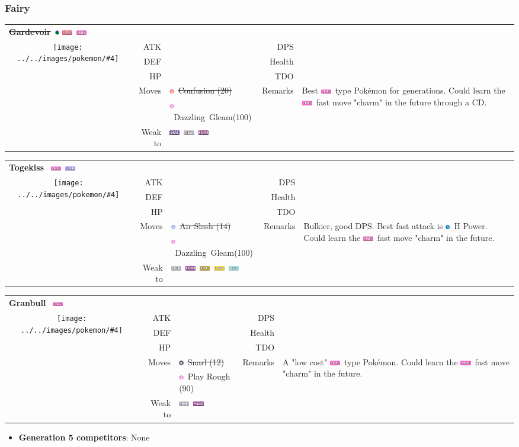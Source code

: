 \documentclass[12pt]{beamer}
\newcommand*{\colorbar}[2]{
\begin{tikzpicture}[line cap=round,line join=round,>=triangle 45,x=1.0cm,y=1.0cm]\clip(-0.15,-0.1) rectangle (2.5,0.1);
\draw [line width=8.pt,color=#1] (0.,0.)-- (#2/130,0.);
\draw[color=white] (0.2,0.) node {\scriptsize{$#2$}};
\end{tikzpicture}
}
\newcommand*{\attack}[1]{\colorbar{red}{#1}}
\newcommand*{\defense}[1]{\colorbar{lightblue}{#1}}
\newcommand*{\stamina}[1]{\colorbar{lightgreen}{#1}}
\newcommand*{\dps}[1]{
\begin{tikzpicture}[line cap=round,line join=round,>=triangle 45,x=1.0cm,y=1.0cm]\clip(-0.15,-0.1) rectangle (2.5,0.1);
\draw [line width=8.pt,color=black] (0.,0.)-- (#1/8.7,0.);
\draw[color=white] (0.3,0.) node {\scriptsize{$#1$}};
\end{tikzpicture}
}
\newcommand*{\survival}[1]{
\begin{tikzpicture}[line cap=round,line join=round,>=triangle 45,x=1.0cm,y=1.0cm]\clip(-0.15,-0.1) rectangle (2.5,0.1);
\draw [line width=8.pt,color=black] (0.,0.)-- (#1/18.,0.);
\draw[color=white] (0.3,0.) node {\scriptsize{$#1$}};
\end{tikzpicture}
}
\newcommand*{\tdo}[1]{
\begin{tikzpicture}[line cap=round,line join=round,>=triangle 45,x=1.0cm,y=1.0cm]\clip(-0.15,-0.1) rectangle (2.5,0.1);
\draw [line width=8.pt,color=black] (0.,0.)-- (#1/282.,0.);
\draw[color=white] (0.3,0.) node {\scriptsize{$#1$}};
\end{tikzpicture}
}
\newcommand{\electricfull}{\includegraphics[height=0.2cm]{../../images/type/full/Electric.png}}
\newcommand{\fairyfull}{\includegraphics[height=0.2cm]{../../images/type/full/Fairy.png}}
\newcommand{\flyingfull}{\includegraphics[height=0.2cm]{../../images/type/full/Flying.png}}
\newcommand{\ghostfull}{\includegraphics[height=0.2cm]{../../images/type/full/Ghost.png}}
\newcommand{\icefull}{\includegraphics[height=0.2cm]{../../images/type/full/Ice.png}}
\newcommand{\psychicfull}{\includegraphics[height=0.2cm]{../../images/type/full/Psychic.png}}
\newcommand{\rockfull}{\includegraphics[height=0.2cm]{../../images/type/full/Rock.png}}
\newcommand{\poisonfull}{\includegraphics[height=0.2cm]{../../images/type/full/Poison.png}}
\newcommand{\steelfull}{\includegraphics[height=0.2cm]{../../images/type/full/Steel.png}}
\newcommand{\dragonsimp}{\includegraphics[height=0.2cm]{../../images/type/simplified/dragon.png}}
\newcommand{\darksimp}{\includegraphics[height=0.2cm]{../../images/type/simplified/dark.png}}
\newcommand{\psysimp}{\includegraphics[height=0.2cm]{../../images/type/simplified/psy.png}}
\newcommand{\fairysimp}{\includegraphics[height=0.2cm]{../../images/type/simplified/fairy.png}}
\newcommand{\flyingsimp}{\includegraphics[height=0.2cm]{../../images/type/simplified/flying.png}}
\newcommand{\megaevol}{\includegraphics[width=0.2cm]{../../images/megaevolve}}
\newcommand*{\pokemon}[6]{
\begin{tabular}{p{3cm}rp{3cm}rp{4cm}} 
\textbf{#1}~#2 \hfill  #3 \\
\multicolumn{1}{c}{\multirow{6}{*}{\texttt{[image: ../../images/pokemon/\#4]}}} 
\pokemonstats#5
\pokemoncontinued#6
\end{tabular}
\medskip
}
\newcommand*{\pokemonstats}[6]{
& ATK  & \attack{#1}     &     DPS & \dps{#4} \\ 
& DEF & \defense{#2}  &  Health & \survival{#5} \\
& HP   & \stamina{#3}  &     TDO & \tdo{#6} \\ 
}
\newcommand{\pokemoncontinued}[4]{
& Moves & #1                 & Remarks & \multirow{3}{3.5cm}{#4} \\
&  		   & #2 & \\
&Weak to    & #3 &   \\
}
\begin{document}


\begin{frame}
\begin{footnotesize}
\frametitle{Fairy}

\begin{block}{}
\begin{center}

\pokemon{\sout{Gardevoir}}{\megaevol}{\psychicfull~\fairyfull}{Gardevoir.png}{{237}{196}{169}{15.09}{26.81}{404.5}}{{\psysimp~\sout{Confusion (20)}}{\fairysimp~Dazzling~Gleam(100)}{\ghostfull~\steelfull~\poisonfull}{Best \fairyfull~type Pokémon for generations. Could learn the \fairyfull~fast move "charm" in the future through a CD.}}
\bigskip
\bigskip

\pokemon{Togekiss}{}{\fairyfull~\flyingfull}{Togekiss.png}{{225}{217}{198}{13.86}{34.30}{475.5}}{{\flyingsimp~\sout{Air Slash (14)}}{\fairysimp~Dazzling~Gleam(100)}{\steelfull~\poisonfull~\rockfull~\electricfull~\icefull}{Bulkier, good DPS. Best fast attack is \dragonsimp~H Power. Could learn the \fairyfull~fast move "charm" in the future.}}
\bigskip
\bigskip

\pokemon{Granbull}{}{\fairyfull}{Granbull.png}{{212}{131}{207}{13.48}{22.49}{303.2}}{{\darksimp~\sout{Snarl (12)}}{\fairysimp~Play Rough (90)}{\steelfull~\poisonfull}{A "low cost" \fairyfull~type Pok\'emon. Could learn the \fairyfull~fast move "charm" in the future.}}
\bigskip
\bigskip

\begin{itemize}
  \item \textbf{Generation 5 competitors}: None
\end{itemize}
\end{center}
\end{block}


\end{footnotesize}
\end{frame}
\end{document}
